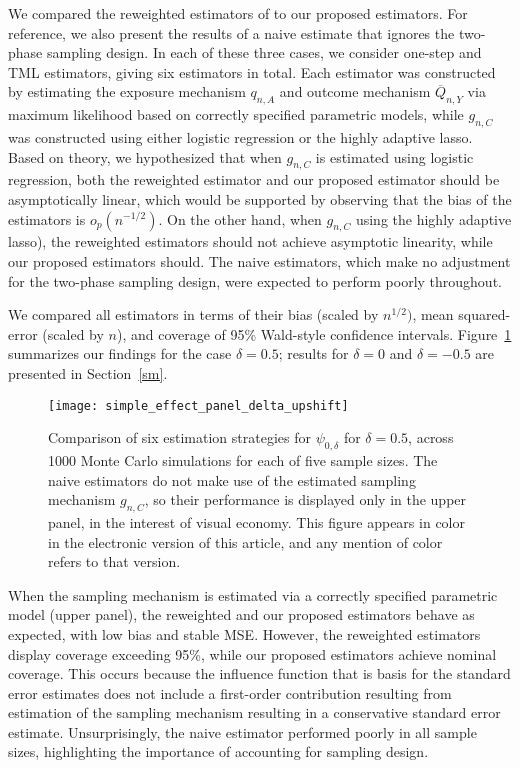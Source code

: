 We compared the reweighted estimators of \citet{rose2011targeted2sd} to our
proposed estimators. For reference, we also present the results of a naive
estimate that ignores the two-phase sampling design. In each of these three
cases, we consider one-step and TML estimators, giving six estimators in total.
Each estimator was constructed by estimating the exposure mechanism $q_{n,A}$
and outcome mechanism $\overline{Q}_{n,Y}$ via maximum likelihood based on
correctly specified parametric models, while $g_{n,C}$ was constructed using
either logistic regression or the highly adaptive lasso. Based on theory, we
hypothesized that when $g_{n,C}$ is estimated using logistic regression, both
the reweighted estimator and our proposed estimator should be asymptotically
linear, which would be supported by observing that the bias of the estimators is
$o_p(n^{-1/2})$. On the other hand, when $g_{n,C}$ using the highly adaptive
lasso), the reweighted estimators should not achieve asymptotic linearity, while
our proposed estimators should. The naive estimators, which make no adjustment
for the two-phase sampling design, were expected to perform poorly throughout.

We compared all estimators in terms of their bias (scaled by $n^{1/2})$, mean
squared-error (scaled by $n$), and coverage of 95\% Wald-style confidence
intervals. Figure~\ref{fig:simple_sim_delta_upshift} summarizes our findings for
the case $\delta = 0.5$; results for $\delta = 0$ and $\delta = -0.5$ are
presented in Section~\ref{sm}.
\begin{figure}[H]
  \centering
  \texttt{[image: simple\_effect\_panel\_delta\_upshift]}
  \caption{Comparison of six estimation strategies
  for $\psi_{0,\delta}$ for $\delta = 0.5$, across 1000 Monte Carlo simulations
  for each of five sample sizes. The naive estimators do not make use of the
  estimated sampling mechanism $g_{n,C}$, so their performance is displayed
  only in the upper panel, in the interest of visual economy. This figure
  appears in color in the electronic version of this article, and any mention
  of color refers to that version.}
  \label{fig:simple_sim_delta_upshift}
\end{figure}

When the sampling mechanism is estimated via a correctly specified parametric
model (upper panel), the reweighted and our proposed estimators behave as
expected, with low bias and stable MSE. However, the reweighted estimators
display coverage exceeding 95\%, while our proposed estimators achieve nominal
coverage. This occurs because the influence function that is basis for the
standard error estimates does not include a first-order contribution resulting
from estimation of the sampling mechanism resulting in a conservative standard
error estimate. Unsurprisingly, the naive estimator performed poorly in all
sample sizes, highlighting the importance of accounting for sampling design.

